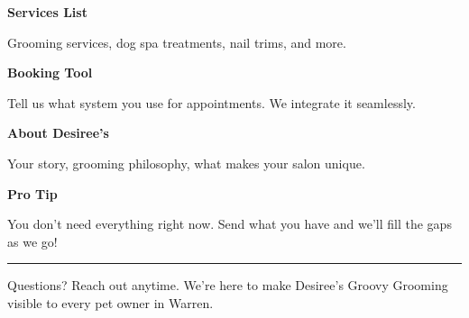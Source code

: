 \documentclass[11pt,letterpaper]{article}
\begin{document}
\begin{minipage}[t]{0.48\textwidth}
\begin{tcolorbox}[colframe=accent-teal, boxrule=1pt, left=0.7em, right=0.7em, top=0.5em, bottom=0.5em, arc=4pt, boxsep=0pt]
{\bfseries\small\color{accent-teal}Services List}

\vspace{0.15em}

{\small Grooming services, dog spa treatments, nail trims, and more.}
\end{tcolorbox}

\vspace{0.1em}

\begin{tcolorbox}[colframe=accent-teal, boxrule=1pt, left=0.7em, right=0.7em, top=0.5em, bottom=0.5em, arc=4pt, boxsep=0pt]
{\bfseries\small\color{accent-teal}Booking Tool}

\vspace{0.15em}

{\small Tell us what system you use for appointments. We integrate it seamlessly.}
\end{tcolorbox}

\vspace{0.1em}

\begin{tcolorbox}[colframe=accent-teal, boxrule=1pt, left=0.7em, right=0.7em, top=0.5em, bottom=0.5em, arc=4pt, boxsep=0pt]
{\bfseries\small\color{accent-teal}About Desiree's}

\vspace{0.15em}

{\small Your story, grooming philosophy, what makes your salon unique.}
\end{tcolorbox}

\vspace{-0.2em}
\end{minipage}

\vspace{0.15em}

\begin{tcolorbox}[colback={accent-red!5}, colframe=accent-red!20, boxrule=0.5pt, left=0.7em, right=0.7em, top=0.4em, bottom=0.4em, arc=6pt, boxsep=0pt]

{\bfseries\small\color{accent-red}Pro Tip}

\vspace{0.1em}

{\small You don't need everything right now. Send what you have and we'll fill the gaps as we go!}

\end{tcolorbox}

\vspace{0.15em}

\noindent\hrule
\vspace{0.2em}

{\small\color{text-light}Questions? Reach out anytime. We're here to make Desiree's Groovy Grooming visible to every pet owner in Warren.}
\end{document}
